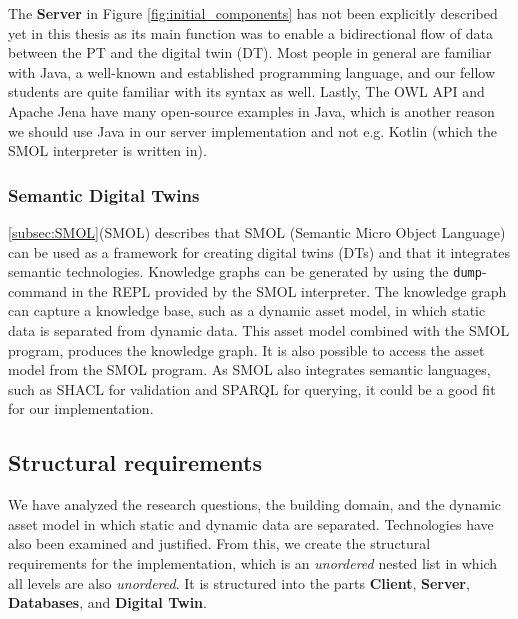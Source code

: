 \documentclass{article}
\begin{document}
The \textbf{Server} in Figure \ref{fig:initial_components} has not been explicitly described yet in this thesis as its main function was to enable a bidirectional flow of data between the PT and the digital twin (DT). Most people in general are familiar with Java,  a well-known and established programming language, and our fellow students are quite familiar with its syntax as well. Lastly, The OWL API and Apache Jena have many open-source examples in Java, which is another reason we should use Java in our server implementation and not e.g. Kotlin (which the SMOL interpreter is written in). 

\subsubsection{Semantic Digital Twins}\label{subsubsec:SemanticDigitalTwins}
\ref{subsec:SMOL}(SMOL) describes that SMOL (Semantic Micro Object Language) can be used as a framework for creating digital twins (DTs) and that it integrates semantic technologies. Knowledge graphs can be generated by using the \verb|dump|-command in the REPL provided by the SMOL interpreter. The knowledge graph can capture a knowledge base, such as a dynamic asset model, in which static data is separated from dynamic data. This asset model combined with the SMOL program, produces the knowledge graph. It is also possible to access the asset model from the SMOL program. As SMOL also integrates semantic languages, such as SHACL for validation and SPARQL for querying, it could be a good fit for our implementation.

\subsection{Structural requirements}\label{subsec:Requirements}
We have analyzed the research questions, the building domain, and the dynamic asset model in which static and dynamic data are separated. Technologies have also been examined and justified. From this, we create the structural requirements for the implementation, which is an \emph{unordered} nested list in which all levels are also \emph{unordered}. It is structured into the parts \textbf{Client}, \textbf{Server}, \textbf{Databases}, and \textbf{Digital Twin}.
\newline
\end{document}
